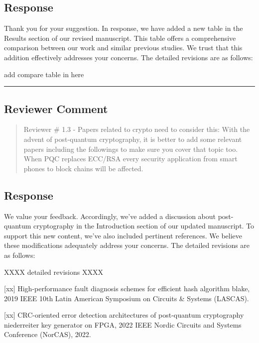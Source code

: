 \subsection{Response}
Thank you for your suggestion. In response, we have added a new table in the Results section of our revised manuscript. This table offers a comprehensive comparison between our work and similar previous studies. We trust that this addition effectively addresses your concerns. The detailed revisions are as follows:

\color{blue}

add compare table in here

\color{black}

\noindent\rule{\linewidth}{2.0pt}

\subsection{Reviewer Comment}
\begin{mdframed}
	\begin{quote}
		Reviewer \# 1.3 - Papers related to crypto need to consider this: With the advent of post-quantum cryptography, it is better to add some relevant papers including the followings to make sure you cover that topic too. When PQC replaces ECC/RSA every security application from smart phones to block chains will be affected.
	\end{quote}
\end{mdframed}

\subsection{Response}

We value your feedback. Accordingly, we've added a discussion about post-quantum cryptography in the Introduction section of our updated manuscript. To support this new content, we've also included pertinent references. We believe these modifications adequately address your concerns. The detailed revisions are as follows:


\color{blue}

XXXX detailed revisions XXXX


	[xx] High-performance fault diagnosis schemes for efficient hash algorithm blake, 2019 IEEE 10th Latin American Symposium on Circuits \& Systems (LASCAS).

	[xx] CRC-oriented error detection architectures of post-quantum cryptography niederreiter key generator on FPGA, 2022 IEEE Nordic Circuits and Systems Conference (NorCAS), 2022.

